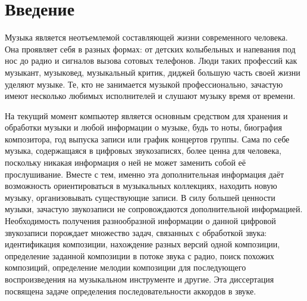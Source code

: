 \chapter*{Введение}							%


Музыка является неотъемлемой составляющей жизни современного человека. Она
проявляет себя в разных формах: от детских колыбельных и напевания под нос до
радио и сигналов вызова сотовых телефонов. Люди таких профессий как музыкант,
музыковед, музыкальный критик, диджей большую часть своей жизни уделяют музыке.
Те, кто не занимается музыкой профессионально, зачастую имеют несколько любимых
исполнителей и слушают музыку время от времени.

На текущий момент компьютер является основным средством для хранения и обработки
музыки и любой информации о музыке, будь то ноты, биография композитора, год
выпуска записи или график концертов группы. Сама по себе музыка, содержащаяся в
цифровых звукозаписях, более ценна для человека, поскольку никакая
информация о ней не может заменить собой её прослушивание. Вместе с тем, именно
эта дополнительная информация даёт возможность ориентироваться в музыкальных
коллекциях, находить новую музыку, организовывать существующие записи. В силу
большей ценности музыки, зачастую звукозаписи не сопровождаются дополнительной
информацией. Необходимость получения разнообразной информации о данной цифровой
звукозаписи порождает множество задач, связанных с обработкой звука:
идентификация композиции, нахождение разных версий одной композиции, определение
заданной композиции в потоке звука с радио, поиск похожих композиций,
определение мелодии композиции для последующего воспроизведения на музыкальном
инструменте и другие. Эта диссертация посвящена задаче определения
последовательности аккордов в звуке.

